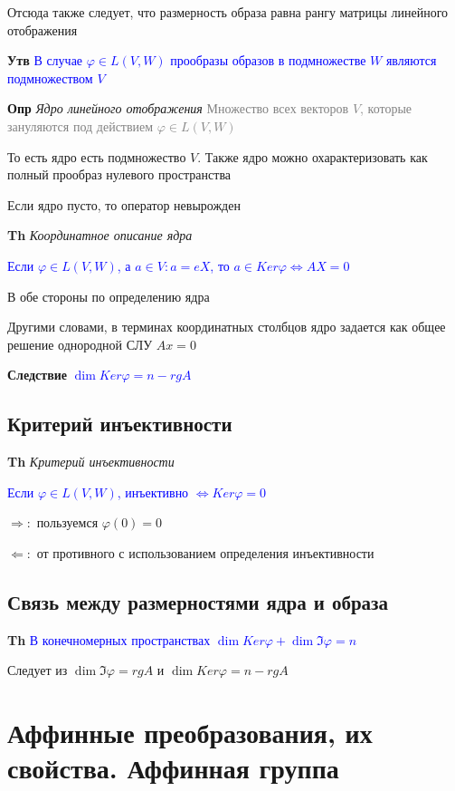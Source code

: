 \documentclass[a4paper, 14pt]{article}
\begin{document}
    Отсюда также следует, что размерность образа равна рангу матрицы линейного отображения

    \textbf{Утв} \textcolor{blue}{В случае $\varphi \in L(V, W)$ прообразы образов в подмножестве $W$ являются
    подмножеством $V$}

    \textbf{Опр} \textit{Ядро линейного отображения} \textcolor{gray}{Множество всех векторов $V$, которые зануляются
    под действием $\varphi \in L(V, W)$}

    То есть ядро есть подмножество $V$.
    Также ядро можно охарактеризовать как полный прообраз нулевого пространства

    Если ядро пусто, то оператор невырожден

    \textbf{Th} \textit{Координатное описание ядра}

    \textcolor{blue}{Если $\varphi \in L(V, W)$, а $a \in V: a = eX$, то $a \in Ker \varphi \Leftrightarrow AX = 0$}

    В обе стороны по определению ядра

    Другими словами, в терминах координатных столбцов ядро задается как общее решение однородной СЛУ $Ax = 0$

    \textbf{Следствие} \textcolor{blue}{$\dim Ker \varphi = n - rg A$}

    \subsection{Критерий инъективности}

    \textbf{Th} \textit{Критерий инъективности}

    \textcolor{blue}{Если $\varphi \in L(V, W)$, инъективно
        $\Leftrightarrow Ker \varphi = 0$}

    $\Rightarrow:$ пользуемся $\varphi(0) = 0$

    $\Leftarrow:$ от противного с использованием определения инъективности

    \subsection{Связь между размерностями ядра и образа}

    \textbf{Th} \textcolor{blue}{В конечномерных пространствах $\dim Ker \varphi + \dim \Im \varphi = n$}

    Следует из $\dim \Im \varphi = rg A$ и $\dim Ker \varphi = n - rg A$

    \section{Аффинные преобразования, их свойства.
    Аффинная группа}
\end{document}
